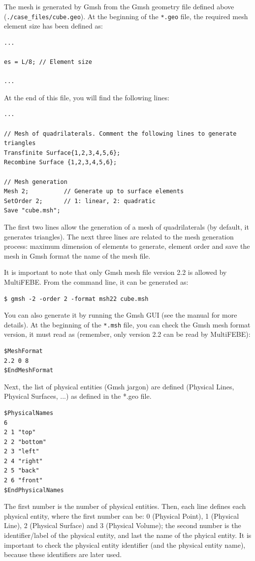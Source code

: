\documentclass[a4]{article}
\begin{document}
The mesh is generated by Gmsh from the Gmsh geometry file defined above (\texttt{./case\_files/cube.geo}). At the beginning of the \texttt{*.geo} file, the required mesh element size has been defined as:
\begin{Verbatim}[frame=single, fontsize=\small, label=cube.geo]
...

es = L/8; // Element size

...
\end{Verbatim}
At the end of this file, you will find the following lines:
\begin{Verbatim}[frame=single, fontsize=\small, label=cube.geo]
...

// Mesh of quadrilaterals. Comment the following lines to generate triangles
Transfinite Surface{1,2,3,4,5,6};
Recombine Surface {1,2,3,4,5,6};

// Mesh generation
Mesh 2;          // Generate up to surface elements
SetOrder 2;      // 1: linear, 2: quadratic
Save "cube.msh";
\end{Verbatim}
The first two lines allow the generation of a mesh of quadrilaterals (by default, it generates triangles). The next three lines are related to the mesh generation process: maximum dimension of elements to generate, element order and save the mesh in Gmsh format the name of the mesh file.

It is important to note that only Gmsh mesh file version 2.2 is allowed by MultiFEBE. From the command line, it can be generated as:
\begin{Verbatim}[frame=single, fontsize=\small, label=command line]
$ gmsh -2 -order 2 -format msh22 cube.msh
\end{Verbatim}
You can also generate it by running the Gmsh GUI (see the manual for more details). At the beginning of the \texttt{*.msh} file, you can check the Gmsh mesh format version, it must read as (remember, only version 2.2 can be read by MultiFEBE):
\begin{Verbatim}[frame=single, fontsize=\small, label=cube.geo]
$MeshFormat
2.2 0 8
$EndMeshFormat
\end{Verbatim}
Next, the list of physical entities (Gmsh jargon) are defined (Physical Lines, Physical Surfaces, ...) as defined in the *.geo file. 
\begin{Verbatim}[frame=single, fontsize=\small, label=cube.geo]
$PhysicalNames
6
2 1 "top"
2 2 "bottom"
2 3 "left"
2 4 "right"
2 5 "back"
2 6 "front"
$EndPhysicalNames
\end{Verbatim}
The first number is the number of physical entities. Then, each line defines each physical entity, where the first number can be: 0 (Physical Point), 1 (Physical Line), 2 (Physical Surface) and 3 (Physical Volume); the second number is the identifier/label of the physical entity, and last the name of the phyical entity. It is important to check the physical entity identifier (and the physical entity name), because these identifiers are later used.
\end{document}
